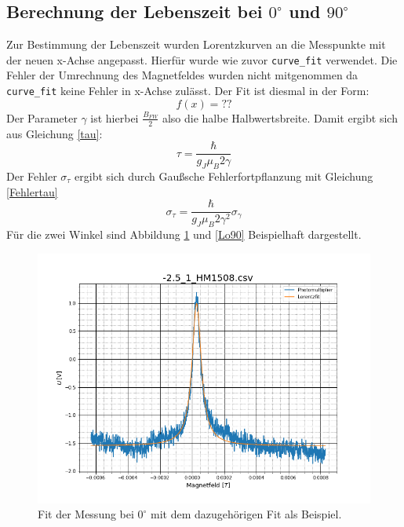 \subsection{Berechnung der Lebenszeit bei $0^\circ$ und $90^\circ$}
Zur Bestimmung der Lebenszeit wurden Lorentzkurven an die Messpunkte mit der neuen x-Achse angepasst. Hierfür wurde wie zuvor \verb|curve_fit| verwendet. Die Fehler der Umrechnung des Magnetfeldes wurden nicht mitgenommen da \verb|curve_fit| keine Fehler in x-Achse zulässt. Der Fit ist diesmal in der Form:
\begin{equation}
	f(x)=??
	\label{Lorenzfit}
\end{equation}
Der Parameter $\gamma$ ist hierbei $\frac{B_{FW}}{2}$ also die halbe Halbwertsbreite. Damit ergibt sich aus Gleichung \ref{tau}:
\begin{equation}
	\tau=\frac{\hbar}{g_J\mu_B2\gamma}
\end{equation} 
Der Fehler $\sigma_\tau$ ergibt sich durch Gaußsche Fehlerfortpflanzung mit Gleichung \ref{Fehlertau}
\begin{equation}
	\sigma_\tau=\frac{\hbar}{g_J\mu_B2\gamma^2}\sigma_\gamma
	\label{Fehlertau}
\end{equation}
Für die zwei Winkel sind Abbildung \ref{Lo0} und \ref{Lo90} Beispielhaft dargestellt.\par
\begin{figure}[ht]
	\includegraphics[scale=0.5]{Bild/GradLorenz0}
	\centering
	\caption[Fit der Lorentzkurve bei Nullgrad]{Fit der Messung bei $0^\circ$ mit dem dazugehörigen Fit als Beispiel.}
	\label{Lo0}
\end{figure}
